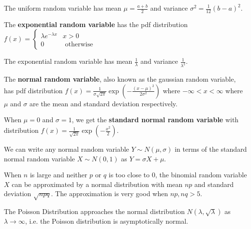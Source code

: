 \begin{prop}
The uniform random variable has mean $\mu = \frac{a + b}{2}$ and variance $\sigma^2 = \frac{1}{12} (b-a)^2$.
\end{prop}

\begin{defn}
    The \textbf{exponential random variable} has the pdf distribution $f(x) = \begin{cases} \lambda e^{-\lambda x} & x > 0 \\ 0 & \text{ otherwise } \end{cases}$
\end{defn}

\begin{prop}
The exponential random variable has mean $\frac{1}{\lambda}$ and variance $\frac{1}{\lambda^2}$.
\end{prop}

\begin{defn}
    The \textbf{normal random variable}, also known as the gaussian random variable, has pdf distribution $f(x) = \displaystyle \frac{1}{\sigma \sqrt{2 \pi}}  \exp\left(\displaystyle - \frac{(x-\mu)^2}{2 \sigma^2}\right)$ where $-\infty < x < \infty$ where $\mu$ and $\sigma$ are the mean and standard deviation respectively.
\end{defn}

\begin{defn}
When $\mu = 0$ and $\sigma = 1$, we get the \textbf{standard normal random variable} with distribution $f(x) = \displaystyle\frac{1}{\sqrt{2\pi}} \exp(-\frac{x^2}{2})$.
\end{defn}

We can write any normal random variable $Y \sim N(\mu, \sigma)$ in terms of the standard normal random variable $X \sim N(0,1)$ as $Y = \sigma X + \mu$.

\begin{prop}
    When $n$ is large and neither $p$ or $q$ is too close to $0$, the binomial random variable $X$ can be approximated by a normal distribution with mean $np$ and standard deviation $\sqrt{npq}$. The approximation is very good when $np, nq > 5$.
\end{prop}

\begin{prop}
    The Poisson Distribution approaches the normal distribution $N(\lambda, \sqrt{\lambda})$ as $\lambda \to \infty$, i.e. the Poisson distribution is asymptotically normal.
\end{prop}

